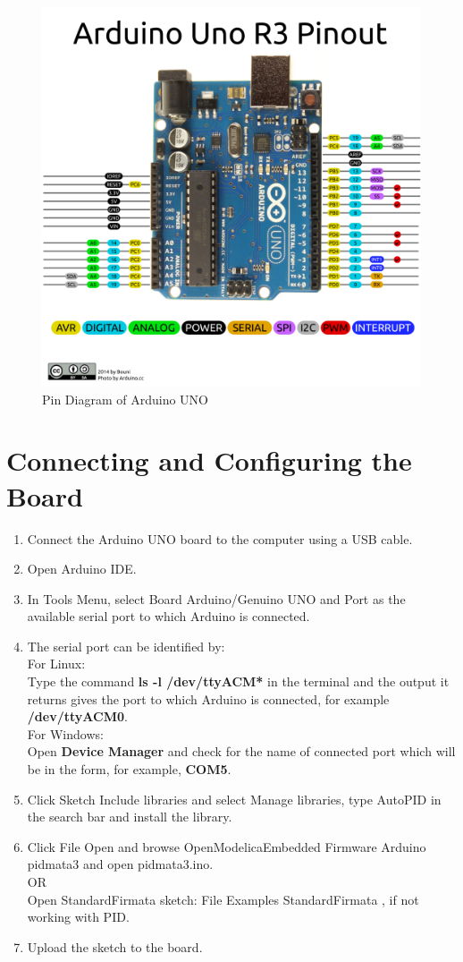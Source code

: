 \documentclass[12pt,a4paper]{report}
\begin{document}
\begin{figure}[H]
\centering
\includegraphics[width =0.75 \textwidth]{arduino_uno_pinout}
\caption{Pin Diagram of Arduino UNO}
\label{figure:13}
\end{figure}

\section{Connecting and Configuring the Board}
\begin{enumerate}
\item Connect the Arduino UNO board to the computer using a USB cable.
\item Open Arduino IDE.
\item In Tools Menu, select Board \textrightarrow Arduino/Genuino UNO  and Port as the available serial port to which Arduino is connected.
\item The serial port can be identified by:\\
For Linux:\\
Type the command \textbf{ls -l /dev/ttyACM*} in the terminal and the output it returns gives the port to which Arduino is connected, for example \textbf{/dev/ttyACM0}.\\
For Windows:\\
Open \textbf{Device Manager} and check for the name of connected port which will be in the form, for example, \textbf{COM5}.
\item Click Sketch \textrightarrow Include libraries and select Manage libraries, type AutoPID in the search bar and install the library.
\item Click File \textrightarrow Open and browse OpenModelicaEmbedded \textrightarrow Firmware \textrightarrow Arduino \textrightarrow pidmata3 and open pidmata3.ino.\\
OR\\
Open StandardFirmata sketch: File \textrightarrow Examples \textrightarrow StandardFirmata , if not working with PID.\\
\item Upload the sketch to the board.
\end{enumerate}
\end{document}
